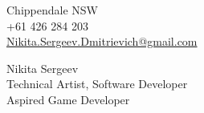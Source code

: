 \documentclass[]{cv-class}
\begin{document}
\thispagestyle{empty}

\begin{minipage}[t]{0.3\textwidth}
\vspace{4.2mm}
Chippendale NSW \\
+61 426 284 203 \\
\href{mailto:Nikita.Sergeev.Dmitrievich+CV@gmail.com}
    {Nikita.Sergeev.Dmitrievich@gmail.com}
\end{minipage}
\hfill
\begin{minipage}[t]{0.65\textwidth}
\begin{flushright}
    {\Huge
        \textcolor{candidate_name_col}{Nikita Sergeev} 
    } \\
    {\large Technical Artist, Software Developer \\ Aspired Game Developer}
\end{flushright}
\end{minipage}

\vspace{3mm}

\bigSeparator{2pt}
\end{document}
